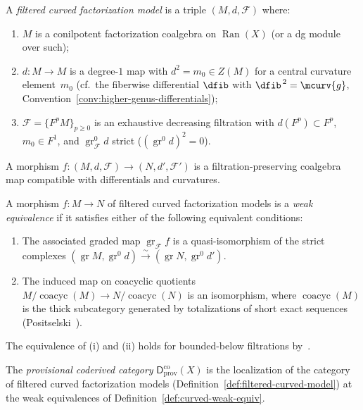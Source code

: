 \begin{definition}
\label{def:filtered-curved-model}
A \emph{filtered curved factorization model} is a triple
$(M, d, \mathcal{F})$ where:
\begin{enumerate}[label=\textup{(\roman*)}]
\item $M$ is a conilpotent factorization coalgebra on $\operatorname{Ran}(X)$
  (or a dg module over such);
\item $d \colon M \to M$ is a degree-$1$ map with
  $d^2 = m_0 \in Z(M)$ for a central curvature element~$m_0$
  (cf.\ the fiberwise differential $\dfib$ with $\dfib^{\,2} = \mcurv{g}$,
  Convention~\textup{\ref{conv:higher-genus-differentials}});
\item $\mathcal{F} = \{F^p M\}_{p \geq 0}$ is an exhaustive
  decreasing filtration with $d(F^p) \subset F^p$,
  $m_0 \in F^1$, and $\operatorname{gr}^0_{\mathcal{F}} d$ strict
  ($(\operatorname{gr}^0 d)^2 = 0$).
\end{enumerate}
A morphism $f \colon (M, d, \mathcal{F}) \to (N, d', \mathcal{F}')$ is a
filtration-preserving coalgebra map compatible with differentials and curvatures.
\end{definition}

\begin{definition}
\label{def:curved-weak-equiv}
A morphism $f \colon M \to N$ of filtered curved factorization models
is a \emph{weak equivalence} if it satisfies either of the following
equivalent conditions:
\begin{enumerate}[label=\textup{(\roman*)}]
\item The associated graded map
  $\operatorname{gr}_{\mathcal{F}} f$ is a quasi-isomorphism of the
  strict complexes $(\operatorname{gr} M, \operatorname{gr}^0 d)
  \xrightarrow{\sim} (\operatorname{gr} N, \operatorname{gr}^0 d')$.
\item The induced map on coacyclic quotients
  $M/\operatorname{coacyc}(M) \to N/\operatorname{coacyc}(N)$ is an
  isomorphism, where $\operatorname{coacyc}(M)$ is the thick subcategory
  generated by totalizations of short exact sequences
  (Positselski~\cite{Positselski11}).
\end{enumerate}
The equivalence of (i) and (ii) holds for bounded-below filtrations
by~\cite[Proposition~3.5]{Positselski11}.
\end{definition}

\begin{definition}
\label{def:provisional-coderived}
The \emph{provisional coderived category} $\mathsf{D}^{\mathrm{co}}_{\mathrm{prov}}(X)$
is the localization of the category of filtered curved factorization
models (Definition~\ref{def:filtered-curved-model}) at the weak
equivalences of Definition~\ref{def:curved-weak-equiv}.
\end{definition}


